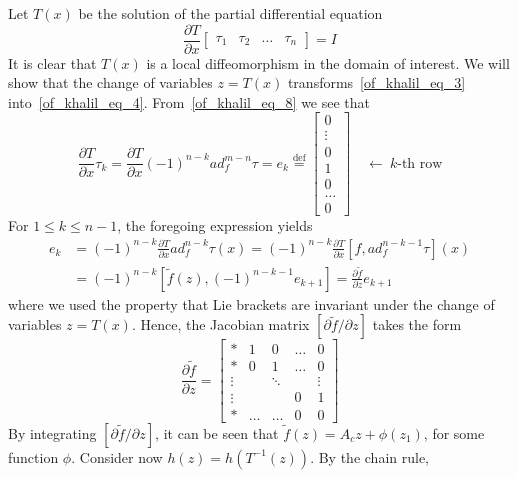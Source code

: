 \documentclass[11pt,a4paper,oneside]{book}
\numberwithin{equation}{section}
\theoremstyle{it}
\theoremstyle{definition}
\begin{document}
Let $T(x)$ be the solution of the partial differential equation 
\begin{equation}\label{of_khalil_eq_8}
	\frac{\partial T}{\partial x}\begin{bmatrix} \tau_1&\tau_2&\dots&\tau_n\end{bmatrix}=I
\end{equation}
It is clear that $T(x)$ is a local diffeomorphism in the domain of interest. We will show that the change of variables $z=T(x)$ transforms~\eqref{of_khalil_eq_3} into~\eqref{of_khalil_eq_4}. From~\eqref{of_khalil_eq_8} we see that
\begin{equation*}
	\frac{\partial T}{\partial x}\tau_k=\frac{\partial T}{\partial x}(-1)^{n-k}ad_f^{m-n}\tau=e_k\stackrel{\text{def}}{=}
	\begin{bmatrix} 0 \\[6pt] \vdots \\[6pt] 0 \\[6pt] 1 \\[6pt] 0 \\[6pt] \dots \\[6pt] 0 \end{bmatrix}\quad\leftarrow\ k\text{-th row}
\end{equation*}
For $1\le k \le n-1$, the foregoing expression yields
\begin{equation*}
	\begin{aligned}
		e_k &= (-1)^{n-k}\frac{\partial T}{\partial x}ad_f^{n-k}\tau(x) = (-1)^{n-k}\frac{\partial T}{\partial x}[f,ad_f^{n-k-1}\tau](x) \\[6pt]
		&= (-1)^{n-k}[\tilde{f}(z),(-1)^{n-k-1}e_{k+1}]=\frac{\partial \tilde{f}}{\partial z}e_{k+1}
	\end{aligned}
\end{equation*}
where we used the property that Lie brackets are invariant under the change of variables $z=T(x)$. Hence, the Jacobian matrix $[\partial \tilde{f}/\partial z]$ takes the form
\begin{equation*}
	\frac{\partial \tilde{f}}{\partial z}=\begin{bmatrix} * & 1 & 0 & \dots & 0 \\[6pt] * & 0 & 1 & \dots & 0 \\[6pt] \vdots &  & \ddots &  & \vdots \\[6pt] \vdots & & & 0 & 1 \\[6pt] * & \dots & \dots & 0 & 0 \end{bmatrix}
\end{equation*}
By integrating $[\partial \tilde{f}/\partial z]$, it can be seen that $\tilde{f}(z)=A_cz+\phi(z_1)$, for some function $\phi$. Consider now $h(z)=h(T^{-1}(z))$. By the chain rule,
\end{document}
